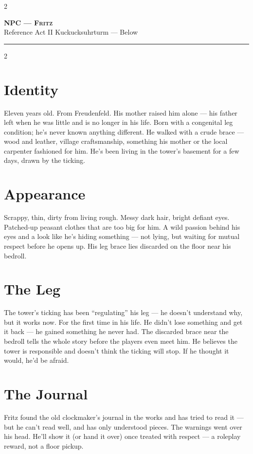 \documentclass[10pt,letterpaper]{article}
\newcommand{\sceneheader}[4]{%
  \fancyhead[L]{\small\textcolor{accent}{\scshape #1}}%
  \fancyhead[R]{\small\textcolor{accent}{#2 \quad \textbullet \quad #3}}%
  \begin{center}
  {\LARGE\bfseries\scshape\textcolor{accent}{#1}}\\[2pt]
  {\small #2 \quad \textbullet \quad #3 \quad \textbullet \quad #4}\\[2pt]
  \textcolor{rulecol}{\rule{0.5\textwidth}{0.8pt}}
  \end{center}
  \vspace{-4pt}
}
\begin{document}
\begin{multicols}{2}
\end{multicols}

\newpage


\label{sec:npc-fritz}\sceneheader{NPC --- Fritz}{Reference}{Act II}{Kuckucksuhrturm --- Below}

\begin{multicols}{2}

\section*{Identity}
Eleven years old. From Freudenfeld. His mother raised him alone --- his father left when he was little and is no longer in his life. Born with a congenital leg condition; he's never known anything different. He walked with a crude brace --- wood and leather, village craftsmanship, something his mother or the local carpenter fashioned for him. He's been living in the tower's basement for a few days, drawn by the ticking.

\section*{Appearance}
Scrappy, thin, dirty from living rough. Messy dark hair, bright defiant eyes. Patched-up peasant clothes that are too big for him. A wild passion behind his eyes and a look like he's hiding something --- not lying, but waiting for mutual respect before he opens up. His leg brace lies discarded on the floor near his bedroll.

\section*{The Leg}
The tower's ticking has been ``regulating'' his leg --- he doesn't understand why, but it works now. For the first time in his life. He didn't lose something and get it back --- he gained something he never had. The discarded brace near the bedroll tells the whole story before the players even meet him. He believes the tower is responsible and doesn't think the ticking will stop. If he thought it would, he'd be afraid.

\section*{The Journal}
Fritz found the old clockmaker's journal in the works and has tried to read it --- but he can't read well, and has only understood pieces. The warnings went over his head. He'll show it (or hand it over) once treated with respect --- a roleplay reward, not a floor pickup.


\end{multicols}
\end{document}
